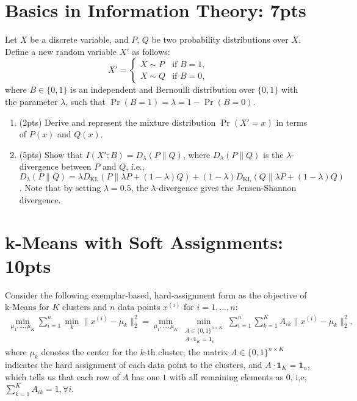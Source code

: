 \documentclass[12pt]{article}
\begin{document}
\section{Basics in Information Theory: 7pts}
Let $X$ be a discrete variable, and $P$, $Q$ be two probability distributions over $X$. Define a new random variable $X'$ as follows:
\begin{equation*}
    X' = \begin{cases}
        X \sim P & \text{if } B=1, \\
        X \sim Q & \text{if } B=0,
    \end{cases}
\end{equation*}
where $B \in \{0,1\}$ is an independent and Bernoulli distribution over $\{0,1\}$ with the parameter $\lambda$, such that $\Pr(B=1) = \lambda = 1-\Pr(B=0)$.

\begin{enumerate}
    \item (2pts) Derive and represent the mixture distribution $\Pr(X' = x)$ in terms of $P(x)$ and $Q(x)$.

    \item (5pts) Show that $I(X';B)=D_{\lambda}(P\|Q)$, where $D_{\lambda}(P\|Q)$ is the $\lambda$-divergence between $P$ and $Q$, i.e., $D_{\lambda}(P\|Q) = \lambda D_{\text{KL}}(P\| \lambda P + (1-\lambda) Q) + (1-\lambda) D_{\text{KL}}(Q \| \lambda P + (1-\lambda) Q)$. Note that by setting $\lambda = 0.5$, the $\lambda$-divergence gives the Jensen-Shannon divergence.

\end{enumerate}

\section{k-Means with Soft Assignments: 10pts}
Consider the following exemplar-based, hard-assignment form as the objective of k-Means for $K$ clusters and $n$ data points $x^{(i)}$ for $i = 1, ..., n$:
\begin{align}
    \label{kmeans}
    \underset{\mu_1, ..., \mu_K}{\min}\sum_{i=1}^n \underset{k}{\min} \|x^{(i)}-\mu_k\|_2^2 = \underset{\mu_1, ..., \mu_K}{\min}\underset{\substack{A \in \{0,1\}^{n\times K} \\ A\cdot\mathbf{1}_K= \mathbf{1}_n}}{\min}\sum_{i=1}^n\sum_{k=1}^K A_{ik}\|x^{(i)} - \mu_k\|^2_2, 
\end{align}
where $\mu_k$ denotes the center for the $k$-th cluster, the matrix $A \in \{0,1\}^{n\times K}$ indicates the hard assignment of each data point to the clusters, and $A\cdot \mathbf{1}_K = \mathbf{1}_n$, which tells us that each row of $A$ has one $1$ with all remaining elements as $0$, i,e, $\sum_{k=1}^K A_{ik} = 1, \forall i$.
\end{document}
